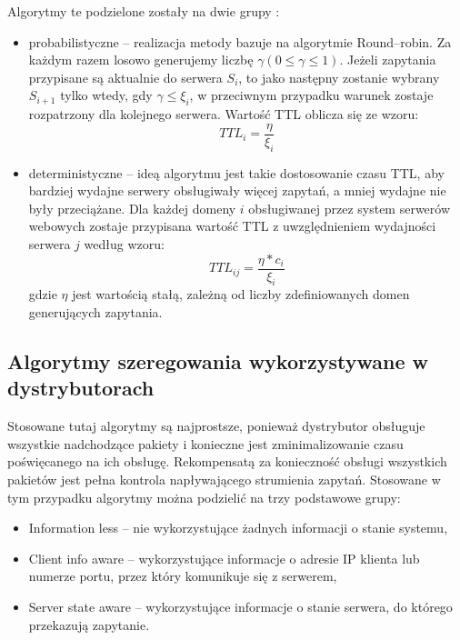 Algorytmy te podzielone zostały na dwie grupy \cite{modele25}:
\begin{itemize}
\item probabilistyczne -- realizacja metody bazuje na algorytmie Round--robin. Za każdym razem losowo generujemy liczbę 
$\gamma(0\leq\gamma\leq1)$. Jeżeli zapytania przypisane są aktualnie do serwera $S_i$, to jako następny zostanie 
wybrany $S_{i+1}$ tylko wtedy,
gdy $\gamma\leq\xi_i$, w przeciwnym przypadku warunek zostaje rozpatrzony dla kolejnego serwera. 
Wartość TTL oblicza się ze wzoru:
\begin{equation}
TTL_i = \frac{\eta}{\xi_i}
\end{equation}
\item deterministyczne -- ideą algorytmu jest takie dostosowanie czasu TTL, aby bardziej wydajne serwery obsługiwały więcej 
zapytań, a mniej wydajne nie były przeciążane. Dla każdej domeny $i$ obsługiwanej przez system serwerów webowych zostaje 
przypisana wartość TTL z  uwzględnieniem wydajności serwera $j$ według wzoru:
\begin{equation}
TTL_{ij} = \frac{\eta * c_i}{\xi_i}
\end{equation}
gdzie $\eta$ jest wartością stałą, zależną od liczby zdefiniowanych domen generujących zapytania.
\end{itemize}

\subsection{Algorytmy szeregowania wykorzystywane w dystrybutorach}

Stosowane tutaj algorytmy  \cite{modele13} są najprostsze, ponieważ dystrybutor obsługuje wszystkie nadchodzące pakiety i konieczne jest 
zminimalizowanie czasu poświęcanego na ich obsługę. Rekompensatą za konieczność obsługi wszystkich pakietów jest pełna 
kontrola napływającego strumienia zapytań. Stosowane w tym przypadku algorytmy można podzielić na trzy podstawowe grupy:
\begin{itemize}
\item Information less -- nie wykorzystujące żadnych informacji o stanie systemu,
\item Client info aware -- wykorzystujące informacje o adresie IP klienta lub numerze portu, przez który komunikuje się z 
serwerem,
\item Server state aware -- wykorzystujące informacje o stanie serwera, do którego przekazują zapytanie.
\end{itemize}

